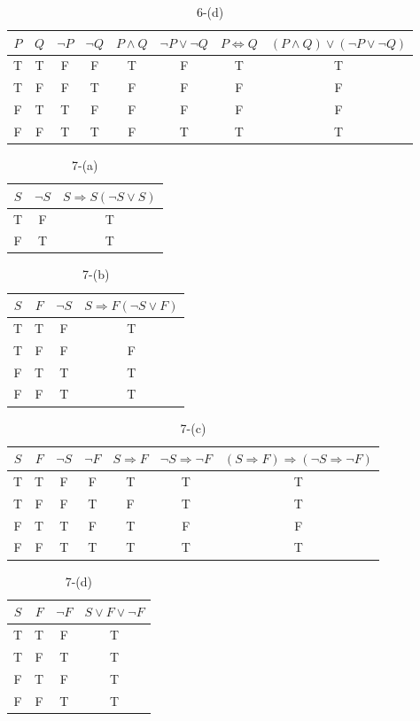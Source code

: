\documentclass{article}
\begin{document}
	\begin{table}[!h]
	\centering
	\caption{6-(d)}
	\begin{tabular}{|c|c|c|c|c|c|c|c|}
	\hline
	$P$ & $Q$ & $\neg P$ & $\neg Q$ & $P \land Q$ & $\neg P \lor \neg Q$ & $P \Leftrightarrow Q$ & $(P \land Q) \lor (\neg P \lor \neg Q)$ \\ \hline
	T & T & F & F & T & F & T & T \\ \hline
	T & F & F & T & F & F & F & F \\ \hline
	F & T & T & F & F & F & F & F \\ \hline
	F & F & T & T & F & T & T & T \\ \hline
	\end{tabular}
	\end{table}		



	\begin{table}[h]
	\centering
	\caption{7-(a)}
	\begin{tabular}{|c|c|c|}
	\hline
	$S$ & $\neg S$ & $S\Rightarrow S (\neg S \lor S)$  \\ \hline
	T & F & T \\ \hline
	F & T & T \\ \hline
	\end{tabular}
	\end{table}	
	

	\begin{table}[h]
	\centering
	\caption{7-(b)}
	\begin{tabular}{|c|c|c|c|}
	\hline
	$S$ & $F$ & $\neg S$ & $S\Rightarrow F (\neg S \lor F)$  \\ \hline
	T & T & F & T\\ \hline
	T & F & F & F\\ \hline
	F & T & T & T\\ \hline
	F & F & T & T\\ \hline
	\end{tabular}
	\end{table}	
	

	\begin{table}[h]
	\centering
	\caption{7-(c)}
	\begin{tabular}{|c|c|c|c|c|c|c|}
	\hline
	$S$ & $F$ & $\neg S$ & $\neg F$ & $S\Rightarrow F$ & $\neg S \Rightarrow \neg F$ & $(S\Rightarrow F)\Rightarrow (\neg S \Rightarrow \neg F)$ \\ \hline
	T & T & F & F & T & T & T\\ \hline
	T & F & F & T & F & T & T\\ \hline
	F & T & T & F & T & F & F\\ \hline
	F & F & T & T & T & T & T\\ \hline
	\end{tabular}
	\end{table}	
	
	
	\begin{table}[h]
	\centering
	\caption{7-(d)}
	\begin{tabular}{|c|c|c|c|}
	\hline
	$S$ & $F$ & $\neg F$ & $S \lor F \lor \neg F$  \\ \hline
	T & T & F & T\\ \hline
	T & F & T & T\\ \hline
	F & T & F & T\\ \hline
	F & F & T & T\\ \hline
	\end{tabular}
	\end{table}	
\end{document}

